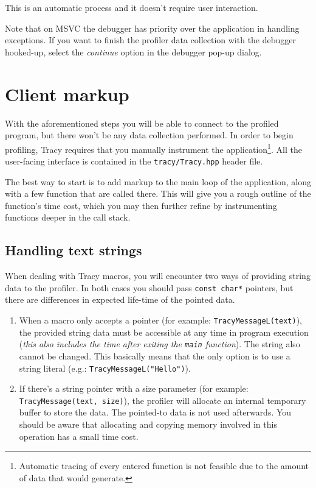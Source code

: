 \documentclass[hidelinks,titlepage,a4paper]{article}
\begin{document}
This is an automatic process and it doesn't require user interaction.

Note that on MSVC the debugger has priority over the application in handling exceptions. If you want to finish the profiler data collection with the debugger hooked-up, select the \emph{continue} option in the debugger pop-up dialog.

\section{Client markup}
\label{client}

With the aforementioned steps you will be able to connect to the profiled program, but there won't be any data collection performed. In order to begin profiling, Tracy requires that you manually instrument the application\footnote{Automatic tracing of every entered function is not feasible due to the amount of data that would generate.}. All the user-facing interface is contained in the \texttt{tracy/Tracy.hpp} header file.

The best way to start is to add markup to the main loop of the application, along with a few function that are called there. This will give you a rough outline of the function's time cost, which you may then further refine by instrumenting functions deeper in the call stack.

\subsection{Handling text strings}

When dealing with Tracy macros, you will encounter two ways of providing string data to the profiler. In both cases you should pass \texttt{const char*} pointers, but there are differences in expected life-time of the pointed data.

\begin{enumerate}
\item When a macro only accepts a pointer (for example: \texttt{TracyMessageL(text)}), the provided string data must be accessible at any time in program execution (\emph{this also includes the time after exiting the \texttt{main} function}). The string also cannot be changed. This basically means that the only option is to use a string literal (e.g.: \texttt{TracyMessageL("Hello")}).

\item If there's a string pointer with a size parameter (for example: \texttt{TracyMessage(text, size)}), the profiler will allocate an internal temporary buffer to store the data. The pointed-to data is not used afterwards. You should be aware that allocating and copying memory involved in this operation has a small time cost.
\end{enumerate}
\end{document}
